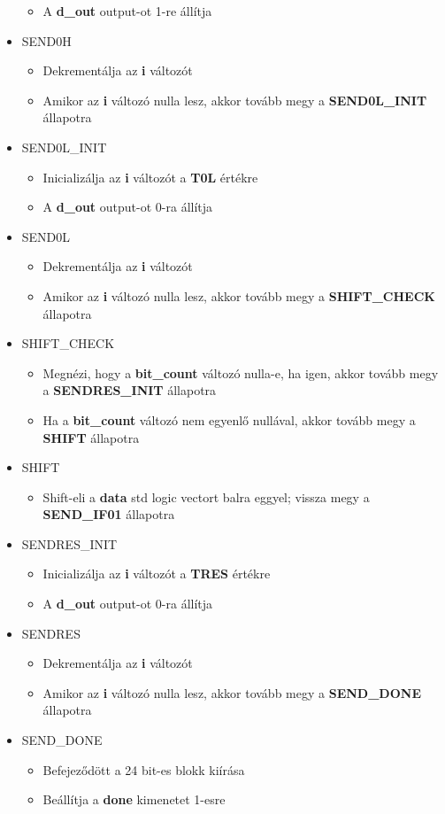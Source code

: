 \begin{itemize}
\begin{itemize}
	\item A \textbf{d\_out} output-ot 1-re állítja
	\end{itemize}
\item SEND0H
	\begin{itemize}
	\item Dekrementálja az \textbf{i} változót
	\item Amikor az \textbf{i} változó nulla lesz, akkor tovább megy a \textbf{SEND0L\_INIT} állapotra
	\end{itemize}
\item SEND0L\_INIT
	\begin{itemize}
	\item Inicializálja az \textbf{i} változót a \textbf{T0L} értékre
	\item A \textbf{d\_out} output-ot 0-ra állítja
	\end{itemize}
\item SEND0L
	\begin{itemize}
	\item Dekrementálja az \textbf{i} változót
	\item Amikor az \textbf{i} változó nulla lesz, akkor tovább megy a \textbf{SHIFT\_CHECK} állapotra
	\end{itemize}
\item SHIFT\_CHECK
	\begin{itemize}
	\item Megnézi, hogy a \textbf{bit\_count} változó nulla-e, ha igen, akkor tovább megy a \textbf{SENDRES\_INIT} állapotra
	\item Ha a \textbf{bit\_count} változó nem egyenlő nullával, akkor tovább megy a \textbf{SHIFT} állapotra
	\end{itemize}
\item SHIFT
	\begin{itemize}
	\item Shift-eli a \textbf{data} std logic vectort balra eggyel; vissza megy a \textbf{SEND\_IF01} állapotra
	\end{itemize}
\item SENDRES\_INIT
	\begin{itemize}
	\item Inicializálja az \textbf{i} változót a \textbf{TRES} értékre
	\item A \textbf{d\_out} output-ot 0-ra állítja
	\end{itemize}
\item SENDRES
	\begin{itemize}
	\item Dekrementálja az \textbf{i} változót
	\item Amikor az \textbf{i} változó nulla lesz, akkor tovább megy a \textbf{SEND\_DONE} állapotra
	\end{itemize}
\item SEND\_DONE
	\begin{itemize}
	\item Befejeződött a 24 bit-es blokk kiírása
	\item Beállítja a \textbf{done} kimenetet 1-esre
	\end{itemize}
\end{itemize}